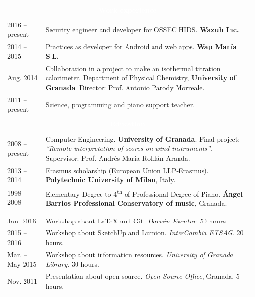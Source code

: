 \documentclass[12pt,a4paper]{article}
\newcommand{\header}[1]{\multicolumn{2}{c}{\cellcolor{black} \textcolor{white} {\bfseries #1}} \\ \\[-12pt]}
\begin{document}
	\begin{longtable}{p{} p{}}
		\header{Work experience}
		2016 -- present & Security engineer and developer for OSSEC HIDS. \newline
		\textbf{Wazuh Inc.} \\
		2014 -- 2015 & Practices as developer for Android and web apps. \newline
		\textbf{Wap Manía S.L.}\\
		Aug. 2014 & Collaboration in a project to make an isothermal titration
		calorimeter. \newline
		Department of Physical Chemistry, \textbf{University of Granada}. \newline
		Director: Prof. Antonio Parody Morreale. \\
		2011 -- present & Science, programming and piano support teacher. \\
		\\
		\header{Education}
		2008 -- present & Computer Engineering. \textbf{University of Granada}. \newline
		Final project: \textit{``Remote interpretation of scores on wind
		instruments''}. \newline
		Supervisor: Prof. Andrés María Roldán Aranda. \\
		2013 -- 2014 & Erasmus scholarship (European Union LLP-Erasmus). \newline
		\textbf{Polytechnic University of Milan}, Italy. \\
		1998 -- 2008 & Elementary Degree to 4\textsuperscript{th} of Professional
		Degree of Piano. \newline
		\textbf{Ángel Barrios Professional Conservatory of music}, Granada. \\
		\newpage
		\header{Courses and events}
		Jan. 2016 & Workshop about LaTeX and Git. \newline
		\textit{Darwin Eventur}. 50 hours. \\
		2015 -- 2016 & Workshop about SketchUp and Lumion. \newline
		\textit{InterCambia ETSAG}. 20 hours. \\
		Mar. -- May 2015 & Workshop about information resources. \newline
		\textit{University of Granada Library}. 30 hours. \\
		Nov. 2011 & Presentation about open source. \newline
		\textit{Open Source Office}, Granada. 5 hours. \\

\end{longtable}
\end{document}
